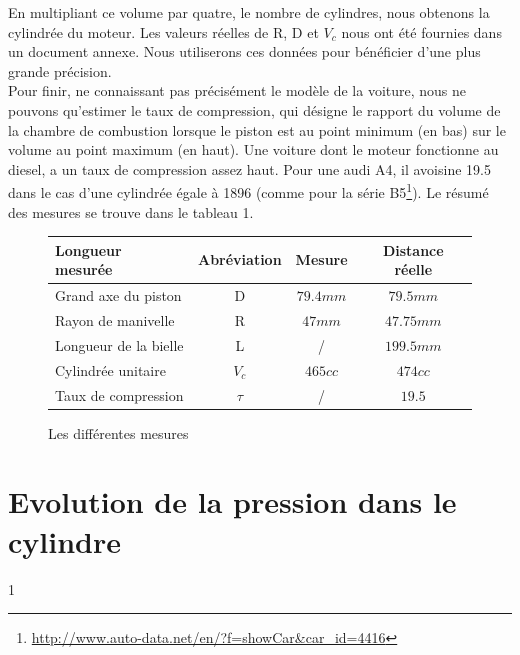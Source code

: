 \documentclass[a4paper,oneside,12pt]{report}
\begin{document}
En multipliant ce volume par quatre, le nombre de cylindres, nous obtenons la cylindrée du moteur. Les valeurs réelles de R, D et $V_c$ nous ont été fournies dans un document annexe. Nous utiliserons ces données pour bénéficier d'une plus grande précision.\\

Pour finir, ne connaissant pas précisément le modèle de la voiture, nous ne pouvons qu'estimer le taux de compression, qui désigne le rapport du volume de la chambre de combustion lorsque le piston est au point minimum (en bas) sur le volume au point maximum (en haut). Une voiture dont le moteur fonctionne au diesel, a un taux de compression assez haut. Pour une audi A4, il avoisine 19.5 dans le cas d'une cylindrée égale à 1896 (comme pour la série
B5\footnote{\url{http://www.auto-data.net/en/?f=showCar&car_id=4416}}). Le résumé des mesures se trouve dans le tableau 1.

\begin{figure}[h]
\centering
\begin{tabular}{|l|c|c|c|}
  \hline
  Longueur mesurée & Abréviation & Mesure & Distance réelle\\
  \hline
  Grand axe du piston & D & $79.4mm$ & $79.5mm$ \\
  Rayon de manivelle & R & $47mm$ & $47.75mm$\\
  Longueur de la bielle & L & / & $199.5mm$\\
  Cylindrée unitaire & $V_c$  & $465cc$ & $474cc$\\
  Taux de compression & $\tau$ & / & $19.5$\\
  \hline
\end{tabular}
\caption{Les différentes mesures}
\end{figure}

\section{Evolution de la pression dans le cylindre}
1%
\end{document}
